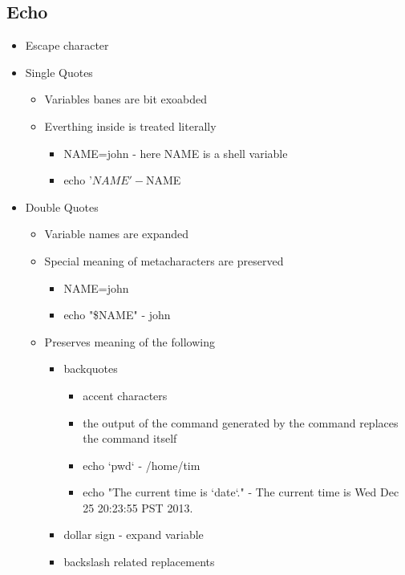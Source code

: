 \documentclass{article}
\begin{document}
\subsection*{Echo}
\begin{itemize}
  \item Escape character \
  \item Single Quotes
  \begin{itemize}
    \item Variables banes are bit exoabded
    \item Everthing inside is treated literally
    \begin{itemize}
      \item NAME=john - here NAME is a shell variable
      \item echo '$NAME' -$NAME
    \end{itemize}
  \end{itemize}
  \item Double Quotes
  \begin{itemize}
    \item Variable names are expanded
    \item Special meaning of metacharacters are preserved
    \begin{itemize}
      \item NAME=john
      \item echo "\$NAME" - john
    \end{itemize}
    \item Preserves meaning of the following
    \begin{itemize}
      \item backquotes
      \begin{itemize}
        \item accent characters
        \item the output of the command generated by the command replaces the command itself
        \item echo `pwd` - /home/tim
        \item echo "The current time is `date`." - The current time is Wed Dec 25 20:23:55 PST 2013.
      \end{itemize}
      \item dollar sign - expand variable
      \item backslash related replacements
    \end{itemize}
  \end{itemize}
\end{itemize}
\end{document}
